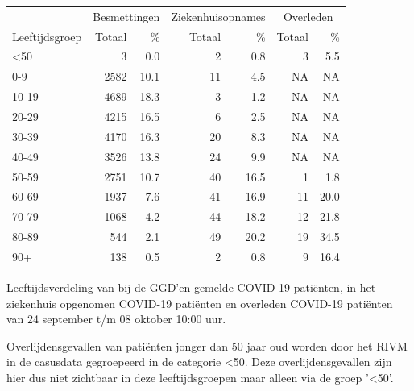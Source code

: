 \documentclass[
  english,
  man,floatsintext]{apa6}
\begin{document}
\begin{table}
\centering\begingroup\fontsize{11}{13}\selectfont

\begin{threeparttable}
\begin{tabular}{lrrrrrr}
\toprule
\multicolumn{1}{c}{ } & \multicolumn{2}{c}{Besmettingen} & \multicolumn{2}{c}{Ziekenhuisopnames} & \multicolumn{2}{c}{Overleden} \\
\cmidrule(l{3pt}r{3pt}){2-3} \cmidrule(l{3pt}r{3pt}){4-5} \cmidrule(l{3pt}r{3pt}){6-7}
Leeftijdsgroep & Totaal & \% & Totaal & \% & Totaal & \%\\
\midrule
<50 & 3 & 0.0 & 2 & 0.8 & 3 & 5.5\\
0-9 & 2582 & 10.1 & 11 & 4.5 & NA & NA\\
10-19 & 4689 & 18.3 & 3 & 1.2 & NA & NA\\
20-29 & 4215 & 16.5 & 6 & 2.5 & NA & NA\\
30-39 & 4170 & 16.3 & 20 & 8.3 & NA & NA\\
40-49 & 3526 & 13.8 & 24 & 9.9 & NA & NA\\
50-59 & 2751 & 10.7 & 40 & 16.5 & 1 & 1.8\\
60-69 & 1937 & 7.6 & 41 & 16.9 & 11 & 20.0\\
70-79 & 1068 & 4.2 & 44 & 18.2 & 12 & 21.8\\
80-89 & 544 & 2.1 & 49 & 20.2 & 19 & 34.5\\
90+ & 138 & 0.5 & 2 & 0.8 & 9 & 16.4\\
\bottomrule
\end{tabular}
\begin{tablenotes}
\item[1] Leeftijdsverdeling van bij de GGD’en gemelde COVID-19 patiënten, in het ziekenhuis opgenomen COVID-19 patiënten en overleden COVID-19 patiënten van 24 september t/m 08 oktober 10:00 uur.
\item[2] Overlijdensgevallen van patiënten jonger dan 50 jaar oud worden door het RIVM in de casusdata gegroepeerd in de categorie <50. Deze overlijdensgevallen zijn hier dus niet zichtbaar in deze leeftijdsgroepen maar alleen via de groep '<50'.
\end{tablenotes}
\end{threeparttable}
\endgroup{}
\end{table}

\newpage
\end{document}
